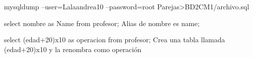 \documentclass[12pt, fleqn]{report}                             %
\theoremstyle{break}                                            %
\begin{document}
     mysqldump --user=Lalaandrea10 --password=root Parejas>BD2CM1/archivo.sql


     select nombre as Name from profesor; Alias de nombre es name;

     select (edad+20)x10 as operacion from profesor; Crea una tabla llamada (edad+20)x10 y la renombra como operación




	\begin{appendices}
	
	
	\end{appendices}
	
    
	
\end{document}
